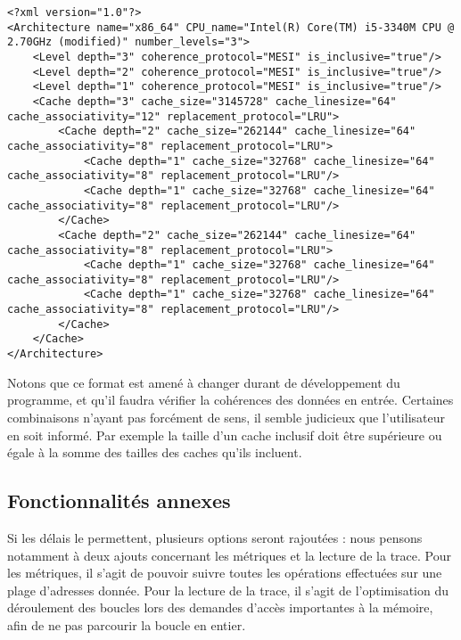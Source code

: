 \begin{lstlisting}
<?xml version="1.0"?>
<Architecture name="x86_64" CPU_name="Intel(R) Core(TM) i5-3340M CPU @ 2.70GHz (modified)" number_levels="3">
    <Level depth="3" coherence_protocol="MESI" is_inclusive="true"/>
    <Level depth="2" coherence_protocol="MESI" is_inclusive="true"/>
    <Level depth="1" coherence_protocol="MESI" is_inclusive="true"/>
    <Cache depth="3" cache_size="3145728" cache_linesize="64" cache_associativity="12" replacement_protocol="LRU">
        <Cache depth="2" cache_size="262144" cache_linesize="64" cache_associativity="8" replacement_protocol="LRU">
            <Cache depth="1" cache_size="32768" cache_linesize="64" cache_associativity="8" replacement_protocol="LRU"/>
            <Cache depth="1" cache_size="32768" cache_linesize="64" cache_associativity="8" replacement_protocol="LRU"/>
        </Cache>
        <Cache depth="2" cache_size="262144" cache_linesize="64" cache_associativity="8" replacement_protocol="LRU">
            <Cache depth="1" cache_size="32768" cache_linesize="64" cache_associativity="8" replacement_protocol="LRU"/>
            <Cache depth="1" cache_size="32768" cache_linesize="64" cache_associativity="8" replacement_protocol="LRU"/>
        </Cache>
    </Cache>
</Architecture>
\end{lstlisting}

Notons que ce format est amené à changer durant de développement du programme, et qu'il faudra vérifier la cohérences des données en entrée. Certaines combinaisons n'ayant pas forcément de sens, il semble judicieux que l'utilisateur en soit informé. Par exemple la taille d'un cache inclusif doit être supérieure ou égale à la somme des tailles des caches qu'ils incluent.

\subsection{Fonctionnalités annexes}

Si les délais le permettent, plusieurs options seront rajoutées : nous pensons notamment à deux ajouts concernant les métriques et la lecture de la trace. Pour les métriques, il s'agit de pouvoir suivre toutes les opérations effectuées sur une plage d'adresses donnée. Pour la lecture de la trace, il s'agit de l'optimisation du déroulement des boucles lors des demandes d'accès importantes à la mémoire, afin de ne pas parcourir la boucle en entier.
